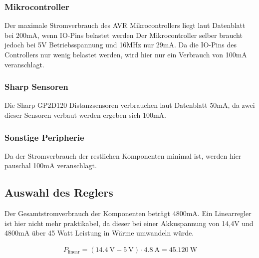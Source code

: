 \subsubsection{Mikrocontroller}
Der maximale Stromverbrauch des AVR Mikrocontrollers liegt laut Datenblatt\cite{ds-at90can} bei 200mA, wenn IO-Pins belastet werden
Der Mikrocontroller selber braucht jedoch bei 5V Betriebsspannung und 16MHz nur 29mA. Da die IO-Pins des Controllers nur wenig belastet werden,
wird hier nur ein Verbrauch von 100mA veranschlagt.

\subsubsection{Sharp Sensoren}
Die Sharp GP2D120 Distanzsensoren verbrauchen laut Datenblatt \cite{ds-sharp-GP2D120} 50mA, da zwei dieser Sensoren verbaut werden ergeben sich 100mA.

\subsubsection{Sonstige Peripherie}
Da der Stromverbrauch der restlichen Komponenten minimal ist, werden hier pauschal 100mA veranschlagt.

\subsection{Auswahl des Reglers}
Der Gesamtstromverbrauch der Komponenten beträgt 4800mA. Ein Linearregler ist hier nicht mehr praktikabel, da dieser bei einer Akkuspannung von 14,4V und 4800mA über 45 Watt Leistung in Wärme umwandeln würde.

\begin{align*}
P_{\text{linear}}=(\SI{14,4}{\V}-\SI{5}{\V})\cdot \SI{4,8}{\A}=\SI{45,120}{\W}
\end{align*}

